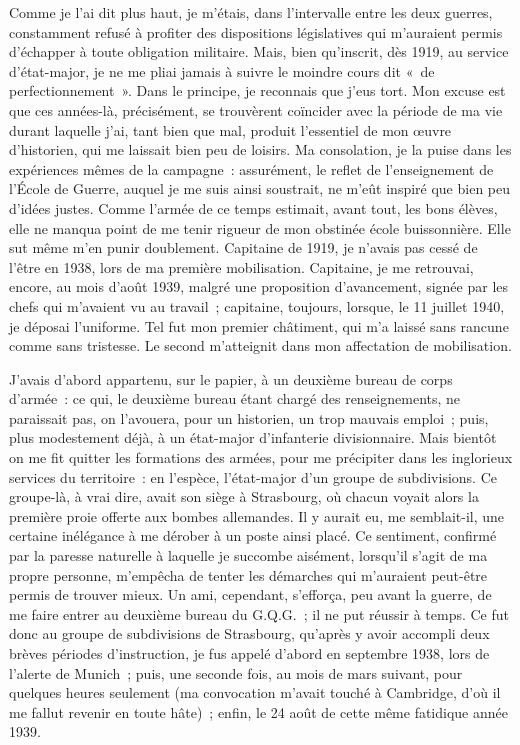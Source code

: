 \documentclass[french,twoside]{book} %
\begin{document}
Comme je l’ai dit plus haut, je m’étais, dans l’intervalle entre les deux guerres, constamment refusé à profiter des dispositions législatives qui m’auraient permis d’échapper à toute obligation militaire. Mais, bien qu’inscrit, dès 1919, au service d’état-major, je ne me pliai jamais à suivre le moindre cours dit « de perfectionnement ». Dans le principe, je reconnais que j’eus tort. Mon excuse est que ces années-là, précisément, se trouvèrent coïncider avec la période de ma vie durant laquelle j’ai, tant bien que mal, produit l’essentiel de mon œuvre d’historien, qui me laissait bien peu de loisirs. Ma consolation, je la puise dans les expériences mêmes de la campagne : assurément, le reflet de l’enseignement de l’École de Guerre, auquel je me suis ainsi soustrait, ne m’eût inspiré que bien peu d’idées justes. Comme l’armée de ce temps estimait, avant tout, les bons élèves, elle ne manqua point de me tenir rigueur de mon obstinée école buissonnière. Elle sut même m’en punir doublement. Capitaine de 1919, je n’avais pas cessé de l’être en 1938, lors de ma première mobilisation. Capitaine, je me retrouvai, encore, au mois d’août 1939, malgré une proposition d’avancement, signée par les chefs qui m’avaient vu au travail ; capitaine, toujours, lorsque, le 11 juillet 1940, je déposai l’uniforme. Tel fut mon premier châtiment, qui m’a laissé sans rancune comme sans tristesse. Le second m’atteignit dans mon affectation de mobilisation.\par
J’avais d’abord appartenu, sur le papier, à un deuxième bureau de corps d’armée : ce qui, le deuxième bureau étant chargé des renseignements, ne paraissait pas, on l’avouera, pour un historien, un trop mauvais emploi ; puis, plus modestement déjà, à un état-major d’infanterie divisionnaire. Mais bientôt on me fit quitter les formations des   armées, pour me précipiter dans les inglorieux services du territoire : en l’espèce, l’état-major d’un groupe de subdivisions. Ce groupe-là, à vrai dire, avait son siège à Strasbourg, où chacun voyait alors la première proie offerte aux bombes allemandes. Il y aurait eu, me semblait-il, une certaine inélégance à me dérober à un poste ainsi placé. Ce sentiment, confirmé par la paresse naturelle à laquelle je succombe aisément, lorsqu’il s’agit de ma propre personne, m’empêcha de tenter les démarches qui m’auraient peut-être permis de trouver mieux. Un ami, cependant, s’efforça, peu avant la guerre, de me faire entrer au deuxième bureau du G.Q.G. ; il ne put réussir à temps. Ce fut donc au groupe de subdivisions de Strasbourg, qu’après y avoir accompli deux brèves périodes d’instruction, je fus appelé d’abord en septembre 1938, lors de l’alerte de Munich ; puis, une seconde fois, au mois de mars suivant, pour quelques heures seulement (ma convocation m’avait touché à Cambridge, d’où il me fallut revenir en toute hâte) ; enfin, le 24 août de cette même fatidique année 1939.\par
\end{document}
